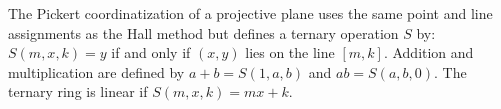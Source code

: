 The Pickert coordinatization of a projective plane uses the same point and line assignments as the Hall method but defines a ternary operation $S$ by: $S(m, x, k) = y$ if and only if $(x, y)$ lies on the line $[m, k]$. Addition and multiplication are defined by $a + b = S(1, a, b)$ and $ab = S(a, b, 0)$. The ternary ring is linear if $S(m, x, k) = mx + k$.

